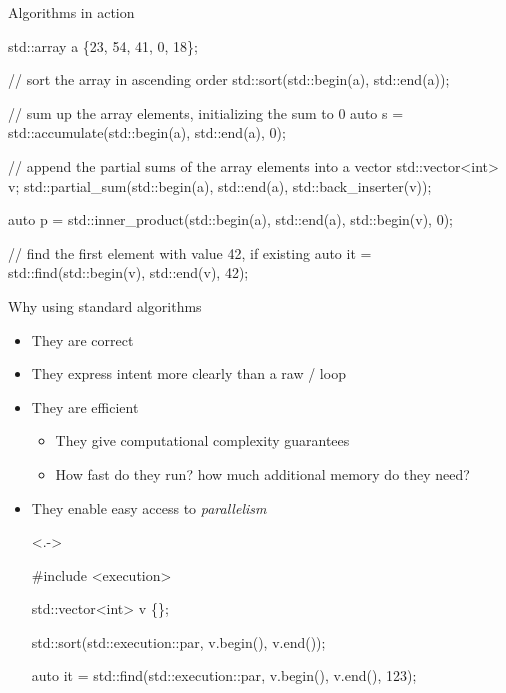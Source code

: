 \begin{frame}[fragile]{Algorithms in action}

  \begin{codeblock}
std::array a \{23, 54, 41, 0, 18\};

// sort the array in ascending order
std::sort(std::begin(a), std::end(a));

// sum up the array elements, initializing the sum to 0
auto s = std::accumulate(std::begin(a), std::end(a), 0);

// append the partial sums of the array elements into a vector
std::vector<int> v;
std::partial\_sum(std::begin(a), std::end(a), std::back\_inserter(v));

auto p = std::inner_product(std::begin(a), std::end(a), std::begin(v), 0);

// find the first element with value 42, if existing
auto it = std::find(std::begin(v), std::end(v), 42);\end{codeblock}

\end{frame}

\begin{frame}[fragile]{Why using standard algorithms}

  \begin{itemize}[<+->]
  \item They are correct
  \item They express intent more clearly than a raw / loop
  \item They are efficient
    \begin{itemize}
    \item They give computational complexity guarantees
    \item How fast do they run? how much additional memory do they need?
    \end{itemize}
  \item They enable easy access to \textit{parallelism}

    \begin{codeblock}<.->{
#include <execution>

std::vector<int> v \{\ddd\};

std::sort(\alert{std::execution::par}, v.begin(), v.end());

auto it = std::find(\alert{std::execution::par}, v.begin(), v.end(), 123);
}\end{codeblock}

  \end{itemize}

\end{frame}

